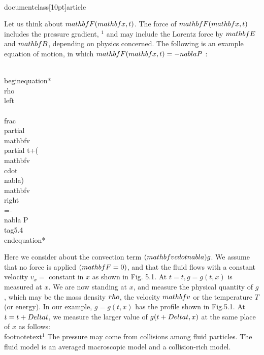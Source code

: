\\documentclass[10pt]{article}
\begin{document}
Let us think about $\\mathbf{F}(\\mathbf{x}, t)$. The force of $\\mathbf{F}(\\mathbf{x}, t)$ includes the pressure gradient, ${ }^{1}$ and may include the Lorentz force by $\\mathbf{E}$ and $\\mathbf{B}$, depending on physics concerned. The following is an example equation of motion, in which $\\mathbf{F}(\\mathbf{x}, t)=-\\nabla P$ :


\\begin{equation*}
\\rho\\left\\{\\frac{\\partial \\mathbf{v}}{\\partial t}+(\\mathbf{v} \\cdot \\nabla) \\mathbf{v}\\right\\}=-\\nabla P \\tag{5.4}
\\end{equation*}


Here we consider about the convection term $(\\mathbf{v} \\cdot \\nabla) g$. We assume that no force is applied $(\\mathbf{F}=0)$, and that the fluid flows with a constant velocity $v_{x}=$ constant in $x$ as shown in Fig. 5.1. At $t=t, g=g(t, x)$ is measured at $x$. We are now standing at $x$, and measure the physical quantity of $g$, which may be the mass density $\\rho$, the velocity $\\mathbf{v}$ or the temperature $T$ (or energy). In our example, $g=g(t, x)$ has the profile shown in Fig.5.1. At $t=t+\\Delta t$, we measure the larger value of $g(t+\\Delta t, x)$ at the same place of $x$ as follows:
\\footnotetext{${ }^{1}$ The pressure may come from collisions among fluid particles. The fluid model is an averaged macroscopic model and a collision-rich model.
}
\end{document}

